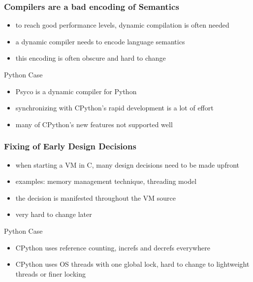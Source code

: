 \documentclass[utf8x]{beamer}
\begin{document}
\begin{frame}
  \frametitle{Compilers are a bad encoding of Semantics}
  \begin{itemize}
  \item to reach good performance levels, dynamic compilation is often needed
  \item a dynamic compiler needs to encode language semantics
  \item this encoding is often obscure and hard to change
  \end{itemize}
  \pause
  \begin{block}{
    Python Case}
    \begin{itemize}
    \item
      Psyco is a dynamic compiler for Python
    \item
      synchronizing with CPython's rapid development is a lot of effort
    \item
      many of CPython's new features not supported well
    \end{itemize}
  \end{block}
\end{frame}

\begin{frame}
  \frametitle{Fixing of Early Design Decisions}
  \begin{itemize}
  \item when starting a VM in C, many design decisions need to be made upfront
  \item examples: memory management technique, threading model
  \item the decision is manifested throughout the VM source
  \item very hard to change later
  \end{itemize}
  \pause
  \begin{block}{
    Python Case}
    \begin{itemize}
    \item
      CPython uses reference counting, increfs and decrefs everywhere
    \item
      CPython uses OS threads with one global lock, hard to change to
      lightweight threads or finer locking
    \end{itemize}
  \end{block}
\end{frame}
\end{document}

